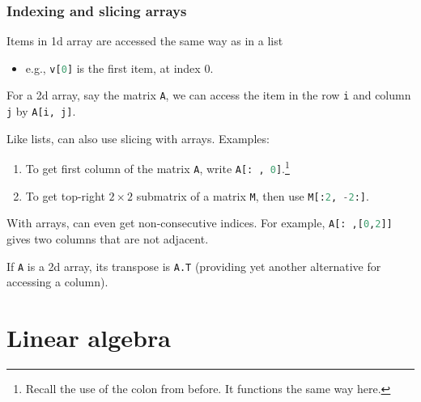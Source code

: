 \documentclass{beamer}
\newenvironment{codeblock}
    {\hfill\begin{beamerboxesrounded}[lower=codecol, width=0.8\textwidth]
    \medskip

    }
    { 
    \end{beamerboxesrounded}\hfill
    }
\theoremstyle{example}
\newcommand{\ct}[1]{\lstinline[language=Python]!#1!}
\newcommand{\ttt}[1]{{\small\texttt{#1}}}
\begin{document}
\begin{frame}
\frametitle{Indexing and slicing arrays}
Items in 1d array are accessed the same way as in a list
\begin{itemize}
    \item[] e.g., \ttt{v}\ct{[0]} is the first item, at index 0.  
\end{itemize}

For a 2d array, say the matrix \ttt{A}, we can access the item in the row \ct{i} and column \ct{j} by \ttt{A}\ct{[i, j]}.

\vspace*{12pt}
\pause
Like lists, can also use slicing with arrays. Examples:
\begin{enumerate}
    \item To get first column of the matrix \ttt{A}, write \ttt{A}\ct{[: , 0]}.\footnote{Recall the use of the colon from before. It functions the same way here.}
    \pause 
    \item To get top-right $2\times 2$ submatrix of a matrix \ttt{M}, then use \ttt{M}\ct{[:2, -2:]}.
\end{enumerate}




\pause
With arrays, can even get non-consecutive indices. For example, \ttt{A}\ct{[: ,[0,2]]} gives two columns that are not adjacent. 

\pause
If \ttt{A} is a 2d array, its transpose is \ttt{A.T} (providing yet another alternative for accessing a column).
\end{frame}

\section{Linear algebra}
\end{document}
